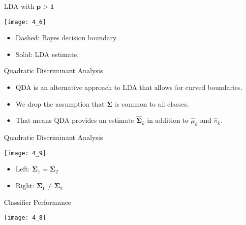 \documentclass[mathserif, aspectratio=169]{beamer}
\begin{document}
\begin{frame}{LDA with $\bm{p > 1}$}
	\vspace{-10mm}
	\begin{center}
		\texttt{[image: 4\_6]}
	\end{center}
	\vspace{-5mm}
	\begin{itemize}
		\item Dashed: Bayes decision boundary.
		\item Solid: LDA estimate.
	\end{itemize}
\end{frame}

\begin{frame}{Quadratic Discriminant Analysis}
	\begin{itemize}
		\item QDA is an alternative approach to LDA that allows for curved boundaries.
		\item We drop the assumption that $\bm{\Sigma}$ is common to all classes.
		\item That means QDA provides an estimate $\bm{\hat{\Sigma}}_k$ in addition
			to $\hat{\mu}_k$ and $\hat{\pi}_k$.
	\end{itemize}
\end{frame}

\begin{frame}{Quadratic Discriminant Analysis}
	\vspace{-10mm}
	\begin{center}
		\texttt{[image: 4\_9]}
	\end{center}
	\vspace{-5mm}
	\begin{itemize}
		\item Left: $\bm{\Sigma}_1 = \bm{\Sigma}_2$
		\item Right: $\bm{\Sigma}_1 \ne \bm{\Sigma}_2$
	\end{itemize}
\end{frame}

\begin{frame}{Classifier Performance}
	\vspace{-10mm}
	\begin{center}
		\texttt{[image: 4\_8]}
	\end{center}
	\vspace{-5mm}
\end{frame}
\end{document}
